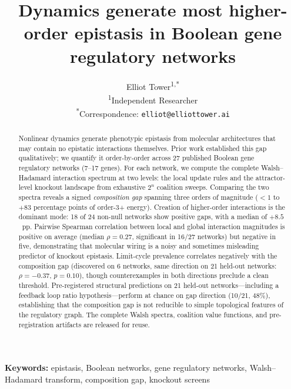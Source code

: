 \documentclass[10pt]{article}
\title{Dynamics generate most higher-order epistasis in Boolean gene regulatory networks}
\author{
  Elliot Tower\textsuperscript{1,*} \\[4pt]
  \small\textsuperscript{1}Independent Researcher \\
  \small\textsuperscript{*}Correspondence: \texttt{elliot@elliottower.ai}
}
\begin{document}
\maketitle
\linenumbers
\doublespacing

\begin{abstract}
Nonlinear dynamics generate phenotypic epistasis from molecular
architectures that may contain no epistatic interactions themselves.
Prior work established this gap qualitatively; we quantify it
order-by-order across 27 published Boolean gene regulatory networks
(7--17 genes). For each network, we compute the complete
Walsh--Hadamard interaction spectrum at two levels: the local update
rules and the attractor-level knockout landscape from exhaustive
$2^n$ coalition sweeps. Comparing the two spectra reveals a signed
\emph{composition gap} spanning three orders of magnitude ($< 1$ to
$+83$ percentage points of order-3+ energy). Creation of higher-order
interactions is the dominant mode: 18 of 24 non-null networks show
positive gaps, with a median of $+8.5$~pp. Pairwise Spearman
correlation between local and global interaction magnitudes is positive
on average (median $\rho = 0.27$, significant in 16/27 networks) but
negative in five, demonstrating that molecular wiring is a noisy and
sometimes misleading predictor of knockout epistasis. Limit-cycle prevalence correlates negatively with the composition gap
(discovered on 6 networks, same direction on 21 held-out networks:
$\rho = -0.37$, $p = 0.10$), though counterexamples in both
directions preclude a clean threshold. Pre-registered structural
predictions on 21 held-out networks---including a feedback loop ratio
hypothesis---perform at chance on gap direction (10/21, 48\%),
establishing that the composition gap is not reducible to simple
topological features of the regulatory graph. The complete Walsh spectra, coalition value functions, and
pre-registration artifacts are released for reuse.
\end{abstract}

\noindent\textbf{Keywords:}
epistasis, Boolean networks, gene regulatory networks,
Walsh--Hadamard transform, composition gap, knockout screens
\end{document}
